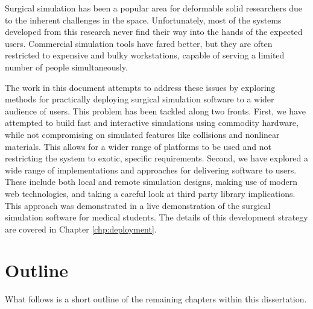 Surgical simulation has been a popular area for deformable solid
researchers due to the inherent challenges in the
space. Unfortunately, most of the systems developed from this research
never find their way into the hands of the expected users. Commercial
simulation tools have fared better, but they are often restricted to
expensive and bulky workstations, capable of serving a limited number
of people simultaneously.

The work in this document attempts to address these issues by
exploring methods for practically deploying surgical simulation
software to a wider audience of users. This problem has been tackled
along two fronts. First, we have attempted to build fast and
interactive simulations using commodity hardware, while not
compromising on simulated features like collisions and nonlinear
materials. This allows for a wider range of platforms to be used and
not restricting the system to exotic, specific requirements. Second,
we have explored a wide range of implementations and approaches for
delivering software to users. These include both local and remote
simulation designs, making use of modern web technologies, and taking
a careful look at third party library implications. This approach was
demonstrated in a live demonstration of the surgical simulation
software for medical students. The details of this development strategy are
covered in Chapter \ref{chp:deployment}.

\section{Outline}

What follows is a short outline of the remaining chapters within this
dissertation.

